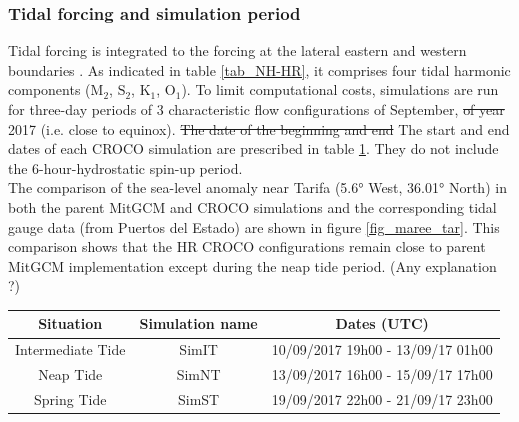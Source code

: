 \subsubsection{Tidal forcing and simulation period}
Tidal forcing is integrated to the forcing \color{blue} at the lateral eastern and western boundaries  \color{black}. As indicated in table \ref{tab_NH-HR}, it comprises four tidal harmonic \color{blue} components ($\text{M}_{\text{2}}$, $\text{S}_{\text{2}}$, $\text{K}_{\text{1}}$, $\text{O}_{\text{1}}$).
To limit computational costs\color{black}, simulations are run for three-day periods \color{blue}of 3 characteristic flow configurations of September, \sout{of year} 2017 (i.e. close to equinox). \sout{The date of the beginning and end} \color{blue}The start and end dates of each CROCO simulation are prescribed in table \ref{tab_dates_MIV}. \color{blue} They do \color{black} not include the 6-hour-hydrostatic spin-up period.\\ 

The comparison of the sea-level anomaly near Tarifa \color{blue}(5.6° West, 36.01° North) \color{black} in both the parent MitGCM and CROCO simulations and the corresponding tidal gauge data (from Puertos del Estado) are shown in figure \ref{fig_maree_tar}. \color{blue} This comparison shows that the HR CROCO configurations remain close to parent MitGCM implementation except during the neap tide period. \color{green}(Any explanation ?) \color{black}

\begin{table}[h]
        \centering
        \begin{tabular}{|c|c|c|}
                \hline
                Situation & Simulation name & Dates (UTC)\\
                \hline
                Intermediate Tide & SimIT & 10/09/2017 19h00 - 13/09/17 01h00  \\
                Neap Tide & SimNT & 13/09/2017 16h00 - 15/09/17 17h00 \\
                Spring Tide & SimST & 19/09/2017 22h00 - 21/09/17 23h00  \\
                \hline
        \end{tabular}
        \label{tab_dates_MIV}
\end{table}

